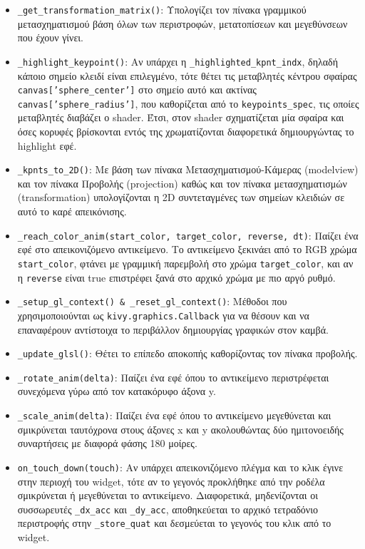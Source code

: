 \begin{itemize}
	\item \texttt{\_get\_transformation\_matrix()}: Υπολογίζει τον πίνακα γραμμικού μετασχηματισμού βάση όλων των περιστροφών, μετατοπίσεων και μεγεθύνσεων που έχουν γίνει.
	
	\item \texttt{\_highlight\_keypoint()}: Αν υπάρχει η \texttt{\_highlighted\_kpnt\_indx}, δηλαδή κάποιο σημείο κλειδί είναι επιλεγμένο, τότε θέτει τις μεταβλητές κέντρου σφαίρας \texttt{canvas['sphere\_center']} στο σημείο αυτό και ακτίνας \texttt{canvas['sphere\_radius']}, που καθορίζεται από το \texttt{keypoints\_spec}, τις οποίες μεταβλητές διαβάζει ο shader. Έτσι, στον shader σχηματίζεται μία σφαίρα και όσες κορυφές βρίσκονται εντός της χρωματίζονται διαφορετικά δημιουργώντας το highlight εφέ.
	
	\item \texttt{\_kpnts\_to\_2D()}: Με βάση των πίνακα Μετασχηματισμού-Κάμερας (modelview) και τον πίνακα Προβολής (projection) καθώς και τον πίνακα μετασχηματισμών (transformation) υπολογίζονται η 2D συντεταγμένες των σημείων κλειδιών σε αυτό το καρέ απεικόνισης.
	
	\item \texttt{\_reach\_color\_anim(start\_color, target\_color, reverse, dt)}: Παίζει ένα εφέ στο απεικονιζόμενο αντικείμενο. Το αντικείμενο ξεκινάει από το RGB χρώμα \texttt{start\_color}, φτάνει με γραμμική παρεμβολή στο χρώμα \texttt{target\_color}, και αν η \texttt{reverse} είναι true επιστρέφει ξανά στο αρχικό χρώμα με πιο αργό ρυθμό.
	
	\item \texttt{\_setup\_gl\_context() \& \_reset\_gl\_context()}: Μέθοδοι που χρησιμοποιούνται ως \texttt{kivy.graphics.Callback} για να θέσουν και να επαναφέρουν αντίστοιχα το περιβάλλον δημιουργίας γραφικών στον καμβά.
	
	\item \texttt{\_update\_glsl()}: Θέτει το επίπεδο αποκοπής καθορίζοντας τον πίνακα προβολής.
	
	\item \texttt{\_rotate\_anim(delta)}: Παίζει ένα εφέ όπου το αντικείμενο περιστρέφεται συνεχόμενα γύρω από τον κατακόρυφο άξονα y.
	
	\item \texttt{\_scale\_anim(delta)}: Παίζει ένα εφέ όπου το αντικείμενο μεγεθύνεται και σμικρύνεται ταυτόχρονα στους άξονες x και y ακολουθώντας δύο ημιτονοειδής συναρτήσεις με διαφορά φάσης 180 μοίρες.
	
	\item \texttt{on\_touch\_down(touch)}: Αν υπάρχει απεικονιζόμενο πλέγμα και το κλικ έγινε στην περιοχή του widget, τότε αν το γεγονός προκλήθηκε από την ροδέλα σμικρύνεται ή μεγεθύνεται το αντικείμενο. Διαφορετικά, μηδενίζονται οι συσσωρευτές \texttt{\_dx\_acc} και \texttt{\_dy\_acc}, αποθηκεύεται το αρχικό τετραδόνιο περιστροφής στην \texttt{\_store\_quat} και δεσμεύεται το γεγονός του κλικ από το widget.
	

\end{itemize}
